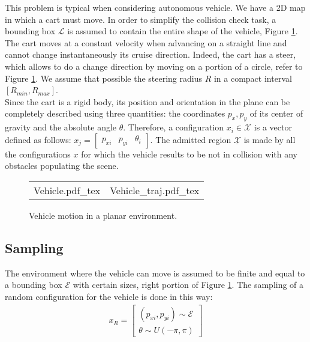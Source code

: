 This problem is typical when considering autonomous vehicle. We have a 2D map in which a cart must move. In order to simplify the collision check task, a bounding box $\mathcal{L}$ is assumed to contain the entire shape of the vehicle, Figure \ref{fig:vehicle}. The cart moves at a constant velocity when advancing on a straight line and cannot change instantaneously its cruise direction. Indeed, the cart has a steer, which allows to do a change direction by moving on a portion of a circle, refer to Figure \ref{fig:vehicle}. 
We assume that possible the steering radius $R$ in a compact interval $[R_{min}, R_{max}]$.
\\
Since the cart is a rigid body, its position and orientation in the plane can be completely described using three quantities: the coordinates $p_x,p_y$ of its center of gravity and the absolute angle $\theta$. Therefore, a configuration $x_i \in \mathcal{X}$ is a vector defined as follows: $x_j = \begin{bmatrix} p_{xi} & p_{yi} & \theta _i  \end{bmatrix}$. The admitted region $\underline{\mathcal{X}}$  is made by all the configurations $x$ for which the vehicle results to be not in collision with any obstacles populating the scene.

 \begin{figure}
\begin{tabular}{cc}
\begin{minipage}[t]{0.49\textwidth}
	 \centering
 \def\svgwidth{0.85 \columnwidth}
 {Vehicle.pdf_tex} 
\end{minipage}
 & 
\begin{minipage}[t]{0.49\textwidth}
	 \centering
 \def\svgwidth{0.85 \columnwidth}
 {Vehicle_traj.pdf_tex} 
\end{minipage}
\end{tabular} 
	 \caption{Vehicle motion in a planar environment.}
 \label{fig:vehicle}
 \end{figure}
 
\subsection{Sampling}

The environment where the vehicle can move is assumed to be finite and equal to a bounding box $\mathcal{E}$ with certain sizes, right portion of Figure \ref{fig:vehicle}. The sampling of a random configuration for the vehicle is done in this way:
\begin{eqnarray}
x_R = \begin{bmatrix} (p_{xi} , p_{yi}) \sim \mathcal{E} \\ \theta \sim U(-\pi, \pi) \end{bmatrix}
\end{eqnarray}

